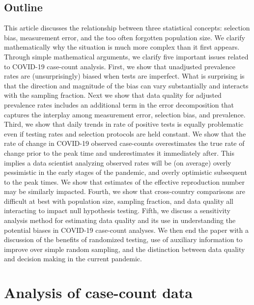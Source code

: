 \documentclass[aoas]{amsart}
\begin{document}

\subsection{Outline}

This article discusses the relationship between three statistical concepts: selection bias, measurement error, and the too often forgotten population size. We clarify mathematically why the situation is much more complex than it first appears.  Through simple mathematical arguments, we clarify five important issues related to COVID-19 case-count analysis.  First, we show that unadjusted prevalence rates are (unsurprisingly) biased when tests are imperfect. What is surprising is that the direction and magnitude of the bias can vary substantially and interacts with the sampling fraction.  Next we show that data quality for adjusted prevalence rates includes an additional term in the error decomposition that captures the interplay among measurement error, selection bias, and prevalence.  Third, we show that daily trends in rate of positive tests is equally problematic even if testing rates and selection protocols are held constant.  We show that the rate of change in COVID-19 observed case-counts overestimates the true rate of change prior to the peak time and underestimates it immediately after.  This implies a data scientist analyzing observed rates will be (on average) overly pessimistic in the early stages of the pandemic, and overly optimistic subsequent to the peak times.  We show that estimates of the effective reproduction number may be similarly impacted.  Fourth, we show that cross-country comparisons are difficult at best with population size, sampling fraction, and data quality all interacting to impact null hypothesis testing.  Fifth, we discuss a sensitivity analysis method for estimating data quality and its use in understanding the potential biases in COVID-19 case-count analyses.  We then end the paper with a discussion of the benefits of randomized testing, use of auxiliary information to improve over simple random sampling, and the distinction between data quality and decision making in the current pandemic.

\section{Analysis of case-count data}
\label{section:casecount}
\end{document}
